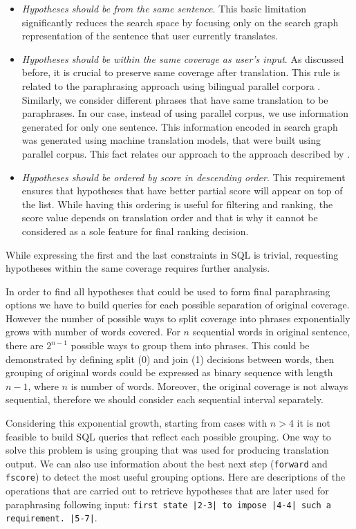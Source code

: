 \begin{itemize}
  \item \emph{Hypotheses should be from the same sentence}. This basic limitation significantly reduces the search space by focusing only on the search graph representation of the sentence that user currently translates.
  \item \emph{Hypotheses should be within the same coverage as user's input}. As discussed before, it is crucial to preserve same coverage after translation. This rule is related to the paraphrasing approach using bilingual parallel corpora \cite{Callison-Burch2007}. Similarly, we consider different phrases that have same translation to be paraphrases. In our case, instead of using parallel corpus, we use information generated for only one sentence. This information encoded in search graph was generated using machine translation models, that were built using parallel corpus. This fact relates our approach to the approach described by \cite{Callison-Burch2007}.
  \item \emph{Hypotheses should be ordered by score in descending order}. This requirement ensures that hypotheses that have better partial score will appear on top of the list. While having this ordering is useful for filtering and ranking, the score value depends on translation order and that is why it cannot be considered as a sole feature for final ranking decision.
\end{itemize}

While expressing the first and the last constraints in SQL is trivial, requesting hypotheses within the same coverage requires further analysis.  

In order to find all hypotheses that could be used to form final paraphrasing options we have to build queries for each possible separation of original coverage. However the number of possible ways to split coverage into phrases exponentially grows with number of words covered. For $n$ sequential words in original sentence, there are $2^{n-1}$ possible ways to group them into phrases. This could be demonstrated by defining \textsf{split (0)} and \textsf{join (1)} decisions between words, then grouping of original words could be expressed as binary sequence with length $n-1$, where $n$ is number of words. Moreover, the original coverage is not always sequential, therefore we should consider each sequential interval separately.

Considering this exponential growth, starting from cases with $n > 4$ it is not feasible to build SQL queries that reflect each possible grouping. One way to solve this problem is using grouping that was used for producing translation output. We can also use information about the best next step (\texttt{forward} and \texttt{fscore}) to detect the most useful grouping options. Here are descriptions of the operations that are carried out to retrieve hypotheses that are later used for paraphrasing following input: \texttt{first state |2-3| to impose |4-4| such a requirement. |5-7|}.

